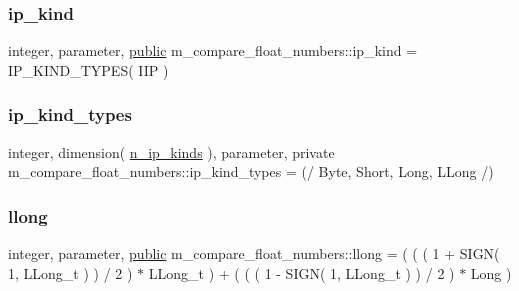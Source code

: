 \mbox{\label{namespacem__compare__float__numbers_a932ca5131dba16f9e2d30e75cf79b574}} 
\subsubsection{\texorpdfstring{ip\+\_\+kind}{ip\_kind}}
{\footnotesize\ttfamily integer, parameter, \hyperlink{M__stopwatch_83_8txt_a2f74811300c361e53b430611a7d1769f}{public} m\+\_\+compare\+\_\+float\+\_\+numbers\+::ip\+\_\+kind = I\+P\+\_\+\+K\+I\+N\+D\+\_\+\+T\+Y\+P\+ES( I\+IP )}

\mbox{\label{namespacem__compare__float__numbers_a18a2ec0b5b6a904a6ccd63fad576f759}} 
\subsubsection{\texorpdfstring{ip\+\_\+kind\+\_\+types}{ip\_kind\_types}}
{\footnotesize\ttfamily integer, dimension( \hyperlink{namespacem__compare__float__numbers_a6cbe22bf2f7aa1ada923de776f8258bf}{n\+\_\+ip\+\_\+kinds} ), parameter, private m\+\_\+compare\+\_\+float\+\_\+numbers\+::ip\+\_\+kind\+\_\+types = (/ Byte, Short, Long, L\+Long /)\hspace{0.3cm}{\ttfamily [private]}}

\mbox{\label{namespacem__compare__float__numbers_a9c3da9dd020c03b19ee8acf1dafdce20}} 
\subsubsection{\texorpdfstring{llong}{llong}}
{\footnotesize\ttfamily integer, parameter, \hyperlink{M__stopwatch_83_8txt_a2f74811300c361e53b430611a7d1769f}{public} m\+\_\+compare\+\_\+float\+\_\+numbers\+::llong = ( ( ( 1 + S\+I\+GN( 1, L\+Long\+\_\+t ) ) / 2 ) $\ast$ L\+Long\+\_\+t ) + ( ( ( 1 -\/ S\+I\+GN( 1, L\+Long\+\_\+t ) ) / 2 ) $\ast$ Long )}

